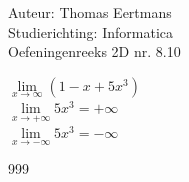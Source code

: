 \documentclass[a4paper]{article}
\begin{document}
  
\noindent \large Auteur: Thomas Eertmans \\
\noindent \large Studierichting: Informatica\\
\noindent \large Oefeningenreeks 2D nr. 8.10\\

\medskip

\normalsize

$\lim\limits_{x\rightarrow\infty} (1-x+5x^3)$ \\

$\lim\limits_{x\rightarrow +\infty} 5x^3 = +\infty$ \\

$\lim\limits_{x\rightarrow -\infty} 5x^3 = -\infty$ \\

\begin{thebibliography}{999}
\end{thebibliography}
\end{document}
